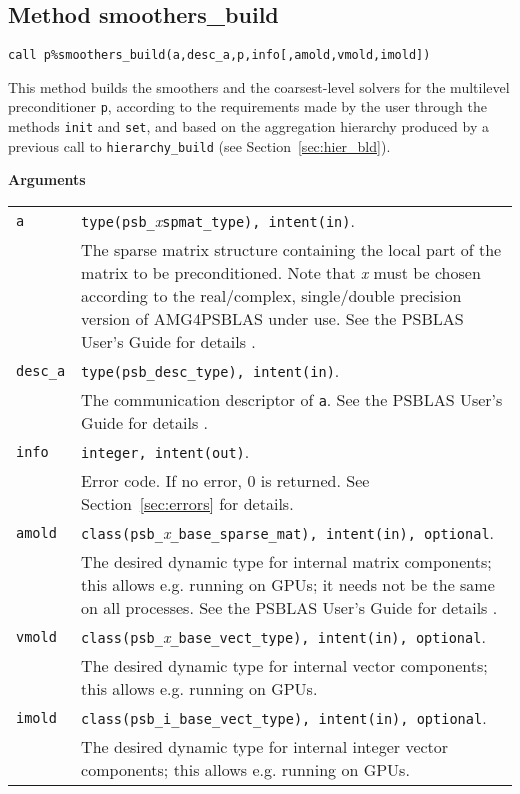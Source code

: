 \clearpage

\subsection{Method smoothers\_build\label{sec:smooth_bld}}


\begin{center}
\verb|call p%smoothers_build(a,desc_a,p,info[,amold,vmold,imold])|\\
\end{center}

\noindent
This method builds the smoothers and the coarsest-level solvers for the
multilevel preconditioner \verb|p|, according to the requirements made by
the user through the methods \verb|init| and \verb|set|, and based on the aggregation
hierarchy produced by a previous call to \verb|hierarchy_build|
(see Section~\ref{sec:hier_bld}).

{\baselineskip\noindent\large\bfseries Arguments} \smallskip

\begin{tabular}{p{1.2cm}p{12cm}}
\verb|a|      & \verb|type(psb_|\emph{x}\verb|spmat_type), intent(in)|. \\
              & The sparse matrix structure containing the local part of the
                matrix to be preconditioned. Note that \emph{x} must be chosen according
                to the real/complex, single/double precision version of AMG4PSBLAS under use.
                See the PSBLAS User's Guide for details \cite{PSBLASGUIDE}.\\
\verb|desc_a| & \verb|type(psb_desc_type), intent(in)|. \\
              & The communication descriptor of \verb|a|. See the PSBLAS User's Guide for
                details \cite{PSBLASGUIDE}.\\
\verb|info|   & \verb|integer, intent(out)|.\\
              & Error code. If no error, 0 is returned. See Section~\ref{sec:errors} for details.\\
\verb|amold| & \verb|class(psb_|\emph{x}\verb|_base_sparse_mat), intent(in), optional|. \\
 & The desired dynamic type for internal matrix
  components; this allows e.g. running on GPUs; it needs not be the
  same on all processes. See the PSBLAS User's Guide for
  details \cite{PSBLASGUIDE}. \\
  \verb|vmold| & \verb|class(psb_|\emph{x}\verb|_base_vect_type), intent(in), optional|. \\
  & The desired dynamic type for internal vector
  components; this allows e.g. running on GPUs. \\
  \verb|imold| & \verb|class(psb_i_base_vect_type), intent(in), optional|. \\
  & The desired dynamic type for internal integer vector
  components; this allows e.g. running on GPUs. \\
\end{tabular}

